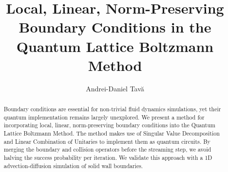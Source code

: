 \documentclass[preprint,12pt,authoryear]{elsarticle}
\begin{document}
\begin{frontmatter}

\title{Local, Linear, Norm-Preserving Boundary Conditions in the Quantum Lattice Boltzmann Method}

\author{Andrei-Daniel Tavă}


\begin{abstract}
Boundary conditions are essential for non-trivial fluid dynamics simulations, yet their quantum implementation remains largely unexplored. 
We present a method for incorporating local, linear, norm-preserving boundary conditions into the Quantum Lattice Boltzmann Method. 
The method makes use of Singular Value Decomposition and Linear Combination of Unitaries to implement them as quantum circuits. 
By merging the boundary and collision operators before the streaming step, we avoid halving the success probability per iteration. 
We validate this approach with a 1D advection-diffusion simulation of solid wall boundaries.
\end{abstract}

\begin{graphicalabstract}
\vspace{5em}
\centering
{}
\end{graphicalabstract}
\end{frontmatter}
\end{document}
